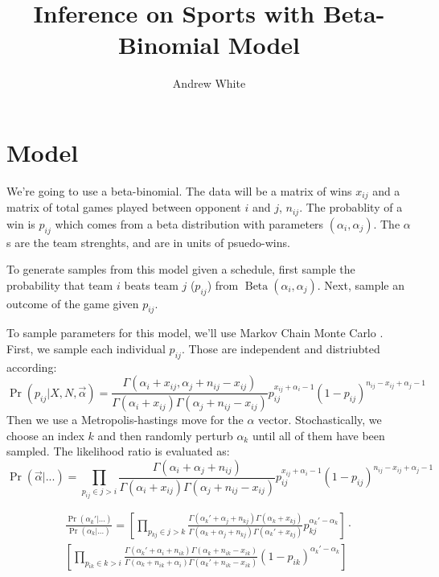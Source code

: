 \documentclass{article}
\author{Andrew White}
\title{Inference on Sports with Beta-Binomial Model}
\DeclareMathOperator{\Beta}{Beta}
\begin{document}
\maketitle

\section{Model}

We're going to use a beta-binomial. The data will be a matrix of
wins $x_{ij}$ and a matrix of total games played between opponent
$i$ and $j$, $n_{ij}$. The probablity of a win is $p_{ij}$ which comes
from a beta distribution with parameters $(\alpha_i, \alpha_j)$. The
$\alpha$s are the team strenghts, and are in units of psuedo-wins.

To generate samples from this model given a schedule, first sample the
probability that team $i$ beats team $j$ ($p_{ij}$) from
$\Beta(\alpha_i, \alpha_j)$. Next, sample an outcome of the game given
$p_{ij}$.

To sample parameters for this model, we'll use Markov Chain Monte
Carlo . First, we sample each individual $p_{ij}$. Those are
independent and distriubted according:
\[
\Pr(p_{ij} | X, N, \vec{\alpha}) = \frac{\Gamma (\alpha_i + x_{ij},
  \alpha_j + n_{ij} - x_{ij})}{\Gamma(\alpha_i +
  x_{ij})\Gamma(\alpha_j + n_{ij} - x_{ij})} p_{ij}^{x_{ij} + \alpha_i
  - 1}(1 - p_{ij})^{n_{ij} - x_{ij} + \alpha_j - 1}
\]
Then we use a Metropolis-hastings move for the $\alpha$
vector. Stochastically, we choose an index $k$ and then randomly
perturb $\alpha_k$ until all of them have been sampled. The likelihood
ratio is evaluated as:
\[
\Pr(\vec{\alpha}|...) = \prod_{p_{ij} \in j > i} \frac{\Gamma (\alpha_i +  \alpha_j + n_{ij})}{\Gamma(\alpha_i + x_{ij})\Gamma(\alpha_j + n_{ij} - x_{ij})} p_{ij}^{x_{ij} + \alpha_i - 1}(1 - p_{ij})^{n_{ij} - x_{ij} + \alpha_j - 1}
\]

\begin{multline}
\frac{\Pr(\alpha_k'|...)}{\Pr(\alpha_k|...)} = \left[\prod_{p_{kj} \in
    j > k} \frac{\Gamma (\alpha_k' + \alpha_j + n_{kj})\Gamma(\alpha_k + x_{kj})}{\Gamma(\alpha_k + \alpha_j + n_{kj})\Gamma(\alpha_k' +
    x_{kj})}
  p_{kj}^{\alpha_k' - \alpha_k}\right] \cdot
\\
\left[\prod_{p_{ik} \in k > i}
  \frac{\Gamma (\alpha_k' +  \alpha_i + n_{ik})\Gamma(\alpha_k + n_{ik} -
    x_{ik})}{\Gamma(\alpha_k + n_{ik} + \alpha_i)\Gamma(\alpha_k' + n_{ik} - x_{ik})} (1 -
  p_{ik})^{\alpha_k' - \alpha_k}\right]
\end{multline}
\end{document}
